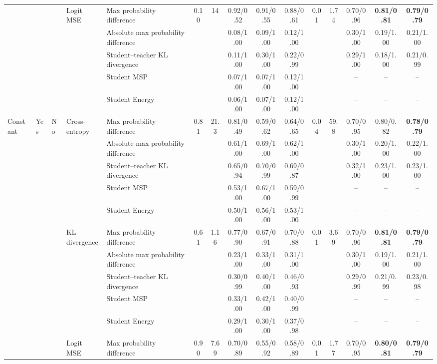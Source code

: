 \documentclass[border=2pt]{standalone}
\begin{document}
\begin{tabular}{lllllcccccccccc}
 &  &  & Logit MSE & Max probability difference & 0.10 & 14 & 0.92/0.52 & 0.91/0.55 & 0.88/0.61 & 0.01 & 1.74 & 0.70/0.96 & \textbf{0.81/0.81} & \textbf{0.79/0.79} \\
 &  &  &  & Absolute max probability difference &  &  & 0.08/1.00 & 0.09/1.00 & 0.12/1.00 &  &  & 0.30/1.00 & 0.19/1.00 & 0.21/1.00 \\
 &  &  &  & Student--teacher KL divergence &  &  & 0.11/1.00 & 0.30/1.00 & 0.22/0.99 &  &  & 0.29/1.00 & 0.18/1.00 & 0.21/0.99 \\
 &  &  &  & Student MSP &  &  & 0.07/1.00 & 0.07/1.00 & 0.12/1.00 &  &  & -- & -- & -- \\
 &  &  &  & Student Energy &  &  & 0.06/1.00 & 0.07/1.00 & 0.12/1.00 &  &  & -- & -- & -- \\
\addlinespace
Constant & Yes & No & Cross-entropy & Max probability difference & 0.81 & 21.3 & 0.81/0.49 & 0.59/0.62 & 0.64/0.65 & 0.04 & 59.8 & 0.70/0.95 & 0.80/0.82 & \textbf{0.78/0.79} \\
 &  &  &  & Absolute max probability difference &  &  & 0.61/1.00 & 0.69/1.00 & 0.62/1.00 &  &  & 0.30/1.00 & 0.20/1.00 & 0.22/1.00 \\
 &  &  &  & Student--teacher KL divergence &  &  & 0.65/0.94 & 0.70/0.99 & 0.69/0.87 &  &  & 0.32/1.00 & 0.23/1.00 & 0.23/1.00 \\
 &  &  &  & Student MSP &  &  & 0.53/1.00 & 0.67/1.00 & 0.59/0.99 &  &  & -- & -- & -- \\
 &  &  &  & Student Energy &  &  & 0.50/1.00 & 0.56/1.00 & 0.53/1.00 &  &  & -- & -- & -- \\
 &  &  & KL divergence & Max probability difference & 0.61 & 1.16 & 0.77/0.90 & 0.67/0.91 & 0.70/0.88 & 0.01 & 3.69 & 0.70/0.96 & \textbf{0.81/0.81} & \textbf{0.79/0.79} \\
 &  &  &  & Absolute max probability difference &  &  & 0.23/1.00 & 0.33/1.00 & 0.31/1.00 &  &  & 0.30/1.00 & 0.19/1.00 & 0.21/1.00 \\
 &  &  &  & Student--teacher KL divergence &  &  & 0.30/0.99 & 0.40/1.00 & 0.46/0.93 &  &  & 0.29/0.99 & 0.21/0.99 & 0.23/0.98 \\
 &  &  &  & Student MSP &  &  & 0.33/1.00 & 0.42/1.00 & 0.40/0.99 &  &  & -- & -- & -- \\
 &  &  &  & Student Energy &  &  & 0.29/1.00 & 0.30/1.00 & 0.37/0.98 &  &  & -- & -- & -- \\
 &  &  & Logit MSE & Max probability difference & 0.90 & 7.69 & 0.70/0.89 & 0.55/0.92 & 0.58/0.89 & 0.01 & 1.77 & 0.70/0.95 & \textbf{0.80/0.81} & \textbf{0.79/0.79} \\

\end{tabular}
\end{document}
